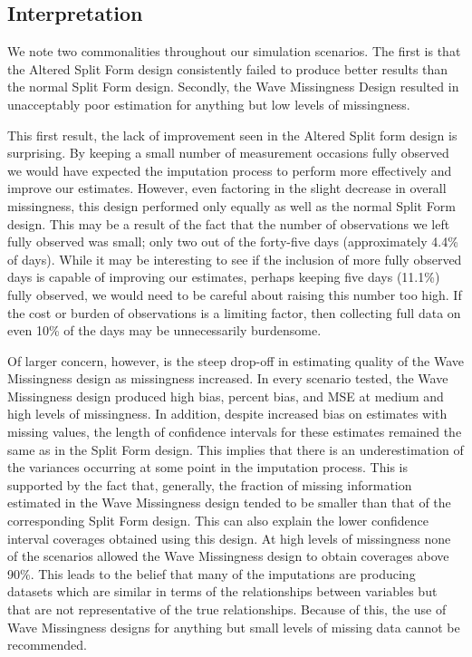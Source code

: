 \documentclass{svjour3}\usepackage[]{graphicx}\usepackage[]{color}
\begin{document}
\subsection{Interpretation}
\label{sec:3.5}
We note two commonalities throughout our simulation scenarios. The first is that the Altered Split Form design consistently failed to produce better results than the normal Split Form design. Secondly, the Wave Missingness Design resulted in unacceptably poor estimation for anything but low levels of missingness. \par

This first result, the lack of improvement seen in the Altered Split form design is surprising. By keeping a small number of measurement occasions fully observed we would have expected the imputation process to perform more effectively and improve our estimates. However, even factoring in the slight decrease in overall missingness, this design performed only equally as well as the normal Split Form design. This may be a result of the fact that the number of observations we left fully observed was small; only two out of the forty-five days (approximately 4.4\% of days). While it may be interesting to see if the inclusion of more fully observed days is capable of improving our estimates, perhaps keeping five days (11.1\%) fully observed, we would need to be careful about raising this number too high. If the cost or burden of observations is a limiting factor, then collecting full data on even 10\% of the days may be unnecessarily burdensome. \par

Of larger concern, however, is the steep drop-off in estimating quality of the Wave Missingness design as missingness increased. In every scenario tested, the Wave Missingness design produced high bias, percent bias, and MSE at medium and high levels of missingness. In addition, despite increased bias on estimates with missing values, the length of confidence intervals for these estimates remained the same as in the Split Form design. This implies that there is an underestimation of the variances occurring at some point in the imputation process. This is supported by the fact that, generally, the fraction of missing information estimated in the Wave Missingness design tended to be smaller than that of the corresponding Split Form design. This can also explain the lower confidence interval coverages obtained using this design. At high levels of missingness none of the scenarios allowed the Wave Missingness design to obtain coverages above 90\%. This leads to the belief that many of the imputations are producing datasets which are similar in terms of the relationships between variables but that are not representative of the true relationships. Because of this, the use of Wave Missingness designs for anything but small levels of missing data cannot be recommended. \par
\end{document}
